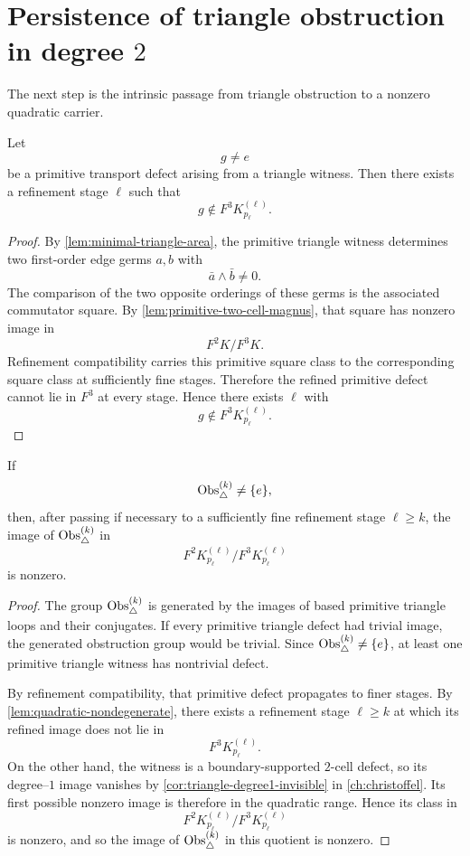 \section{\texorpdfstring{Persistence of triangle obstruction in degree \(2\)}{Persistence of triangle obstruction in degree 2}}
\label{sec:interface-persistence}
The next step is the intrinsic passage from triangle obstruction to a
nonzero quadratic carrier.
\begin{lemma}
	\label{lem:quadratic-nondegenerate}
	Let
	\[
		g\neq e
	\]
	be a primitive transport defect arising from a triangle witness.
	Then there exists a refinement stage \(\ell\) such that
	\[
		g\notin F^3K_{p_\ell}^{(\ell)}.
	\]
\end{lemma}
\begin{proof}
	By \cref{lem:minimal-triangle-area}, the primitive triangle witness
	determines two first-order edge germs \(a,b\) with
	\[
		\bar a\wedge\bar b\neq0.
	\]
	The comparison of the two opposite orderings of these germs is the
	associated commutator square.  By
	\cref{lem:primitive-two-cell-magnus}, that square has nonzero image in
	\[
		F^2K/F^3K.
	\]
	Refinement compatibility carries this primitive square class to the
	corresponding square class at sufficiently fine stages.  Therefore the
	refined primitive defect cannot lie in \(F^3\) at every stage.  Hence
	there exists \(\ell\) with
	\[
		g\notin F^3K_{p_\ell}^{(\ell)}.
	\]
\end{proof}
\begin{lemma}
	\label{lem:interface-persistence}
	If
	\[
		\operatorname{Obs}_\triangle^{(k)}\neq \{e\},
	\]
	then, after passing if necessary to a sufficiently fine refinement stage
	\(\ell\ge k\), the image of \(\operatorname{Obs}_\triangle^{(k)}\) in
	\[
		F^2K_{p_\ell}^{(\ell)}/F^3K_{p_\ell}^{(\ell)}
	\]
	is nonzero.
\end{lemma}
\begin{proof}
	The group \(\operatorname{Obs}_\triangle^{(k)}\) is generated by the images of based
	primitive triangle loops and their conjugates.  If every primitive
	triangle defect had trivial image, the generated obstruction group would
	be trivial.  Since \(\operatorname{Obs}_\triangle^{(k)}\neq \{e\}\), at least one
	primitive triangle witness has nontrivial defect.

	By refinement compatibility, that primitive defect propagates to finer
	stages.  By \cref{lem:quadratic-nondegenerate}, there exists a refinement
	stage \(\ell\ge k\) at which its refined image does not lie in
	\[
		F^3K_{p_\ell}^{(\ell)}.
	\]
	On the other hand, the witness is a boundary-supported \(2\)-cell
	defect, so its degree--\(1\) image vanishes by
	\cref{cor:triangle-degree1-invisible} in \cref{ch:christoffel}.  Its
	first possible nonzero image is therefore in the quadratic range.  Hence
	its class in
	\[
		F^2K_{p_\ell}^{(\ell)}/F^3K_{p_\ell}^{(\ell)}
	\]
	is nonzero, and so the image of \(\operatorname{Obs}_\triangle^{(k)}\) in this quotient
	is nonzero.
\end{proof}
